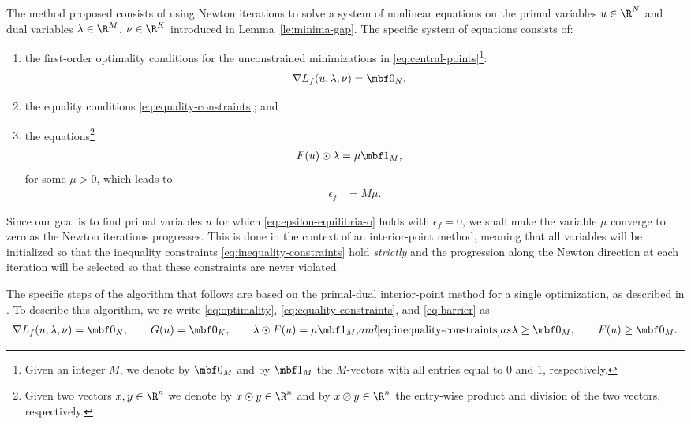 \documentclass[11pt]{article}
\begin{document}
The method proposed consists of using Newton iterations to solve a
system of nonlinear equations on the primal variables $u\in\R^{N}$
and dual variables $\lambda\in\R^{M}$, $\nu\in\R^{K}$ introduced in
Lemma~\ref{le:minima-gap}. The specific system of equations
consists of:
\begin{enumerate}
\item the first-order optimality conditions for the unconstrained
  minimizations in \eqref{eq:central-points}\footnote{Given an integer
    $M$, we denote by $\mbf 0_M$ and by $\mbf 1_M$ the $M$-vectors
    with all entries equal to 0 and 1, respectively.}:
  \begin{align}\label{eq:optimality}
    \nabla L_f(u,\lambda,\nu)&=\mbf 0_{N}, &
  \end{align}
\item the equality conditions \eqref{eq:equality-constraints}; and
\item the equations\footnote{Given two vectors $x,y\in\R^n$ we denote by
    $x\odot y\in\R^n$ and by $x\oslash y\in\R^n$ the entry-wise product and
    division of the two vectors, respectively.}
  \begin{align}\label{eq:barrier}
    F(u)\odot\lambda&=\mu\mbf 1_{M},
  \end{align}
  for some $\mu>0$, which leads to
  \begin{align*}
    \epsilon_f&=M \mu.
  \end{align*}
\end{enumerate}
Since our goal is to find primal variables $u$ for which
\eqref{eq:epsilon-equilibria-o} holds with $\epsilon_f=0$, we shall make the
variable $\mu$ converge to zero as the Newton iterations
progresses. This is done in the context of an interior-point method,
meaning that all variables will be initialized so that the inequality
constraints \eqref{eq:inequality-constraints} hold \emph{strictly} and
the progression along the Newton direction at each iteration will be
selected so that these constraints are never violated.

\medskip

The specific steps of the algorithm that follows are based on the
primal-dual interior-point method for a single optimization, as
described in \cite{Vandenberghe2010}. To describe this algorithm, we
re-write \eqref{eq:optimality}, \eqref{eq:equality-constraints}, and
\eqref{eq:barrier} as
\begin{subequations}\label{eq:primal-dual}
  \begin{gather}
    \label{eq:primal-dual-equalities}
    \nabla L_f(u,\lambda,\nu)=\mbf 0_{N}, \qquad
    G(u)=\mbf 0 _{K}, \qquad
    \lambda\odot F(u)=\mu\mbf 1_{M}, 
  \end{gather}
and \eqref{eq:inequality-constraints} as
\begin{gather}
  \label{eq:primal-dual-inequalities}
  \lambda\ge \mbf 0_{M}, \qquad F(u)\ge \mbf 0_{M}.
\end{gather}
\end{subequations}
\end{document}
